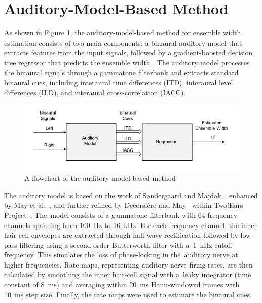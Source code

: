 \section{Auditory-Model-Based Method}
\label{sec:methods:auditory}

As shown in Figure \ref{fig:fig3}, the auditory-model-based method for ensemble width estimation consists of two main components: a binaural auditory model that extracts features from the input signals, followed by a gradient-boosted decision tree regressor that predicts the ensemble width \cite{antoniuk_ensemble_2024}. The auditory model processes the binaural signals through a gammatone filterbank and extracts standard binaural cues, including interaural time differences (ITD), interaural level differences (ILD), and interaural cross-correlation (IACC).

\begin{figure}[htbp]
	\begin{center}
		\includegraphics[width=1.0\linewidth]{img/auditory_flowchart.png} 
	\end{center}
	\caption{A flowchart of the auditory-model-based method \cite{antoniuk_ensemble_2024}} \label{fig:fig3}
\end{figure}

The auditory model is based on the work of S{\o}ndergaard and Majdak~\cite{blauert_technology_2013}, enhanced by May et al.~\cite{may_probabilistic_2011}, and further refined by Decorsi{\`e}re and May~\cite{decorsiere_auditory_2016} within Two!Ears Project~\cite{raake_computational_2016}. The~model consists of a gammatone filterbank with 64 frequency channels spanning from 100~Hz to 16~kHz. For each frequency channel, the inner hair-cell envelopes are extracted through half-wave rectification followed by low-pass filtering using a second-order Butterworth filter with a~1~kHz cutoff frequency. This simulates the loss of phase-locking in the~auditory nerve at higher frequencies. Rate maps, representing auditory nerve firing rates, are then calculated by smoothing the inner hair-cell signal with a~leaky integrator (time constant of 8~ms) and averaging within 20~ms Hann-windowed frames with 10~ms step size. Finally, the rate maps were used to estimate the binaural cues.

